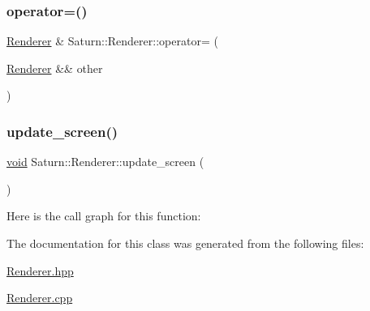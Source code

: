 \mbox{\label{class_saturn_1_1_renderer_a951aa53f75af86f17e977bc79e44e6ba}} 
\subsubsection{\texorpdfstring{operator=()}{operator=()}\hspace{0.1cm}{\footnotesize\ttfamily [2/2]}}
{\footnotesize\ttfamily \mbox{\hyperlink{class_saturn_1_1_renderer}{Renderer}} \& Saturn\+::\+Renderer\+::operator= (\begin{DoxyParamCaption}\item[{\mbox{\hyperlink{class_saturn_1_1_renderer}{Renderer}} \&\&}]{other }\end{DoxyParamCaption})}

\mbox{\label{class_saturn_1_1_renderer_a6332346e6ceb8802a98387d9c7c41515}} 
\subsubsection{\texorpdfstring{update\+\_\+screen()}{update\_screen()}}
{\footnotesize\ttfamily \mbox{\hyperlink{glad_8h_a950fc91edb4504f62f1c577bf4727c29}{void}} Saturn\+::\+Renderer\+::update\+\_\+screen (\begin{DoxyParamCaption}{ }\end{DoxyParamCaption})}

Here is the call graph for this function\+:


The documentation for this class was generated from the following files\+:\begin{DoxyCompactItemize}
\item 
\mbox{\hyperlink{_renderer_8hpp}{Renderer.\+hpp}}\item 
\mbox{\hyperlink{_renderer_8cpp}{Renderer.\+cpp}}\end{DoxyCompactItemize}
